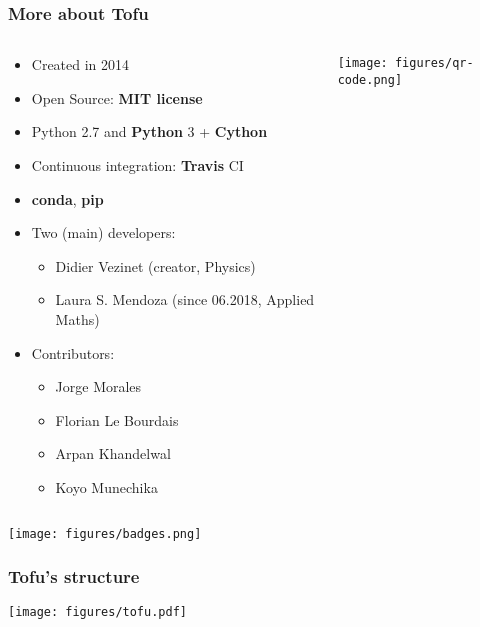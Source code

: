 \documentclass[10pt]{beamer}
\begin{document}
\begin{frame}
\frametitle{More about Tofu}

\begin{columns}
\begin{column}{0.65\textwidth}
\begin{itemize}
	\item Created in 2014
	\item Open Source:\textbf{ MIT license}
	\item Python 2.7 and \textbf{Python} 3 + \textbf{Cython}
	\item Continuous integration: \textbf{Travis} CI
	\item \textbf{conda}, \textbf{pip}
	\item Two (main) developers:
	\begin{itemize}
		\item Didier Vezinet (creator, Physics)
		\item Laura S. Mendoza (since 06.2018, Applied Maths)
	\end{itemize}
	\item Contributors:
	\begin{itemize}
		\item Jorge Morales
		\item Florian Le Bourdais
		\item Arpan Khandelwal
		\item Koyo Munechika
	\end{itemize}
\end{itemize}
\end{column}
\begin{column}{0.35\textwidth}
\begin{center}
	\texttt{[image: figures/qr-code.png]}
\end{center}
\end{column}
\end{columns}
\begin{center}
	\texttt{[image: figures/badges.png]}
\end{center}

\end{frame}

\begin{frame}
\frametitle{Tofu's structure}

\begin{center}
	\texttt{[image: figures/tofu.pdf]}
\end{center}

\end{frame}
\end{document}
